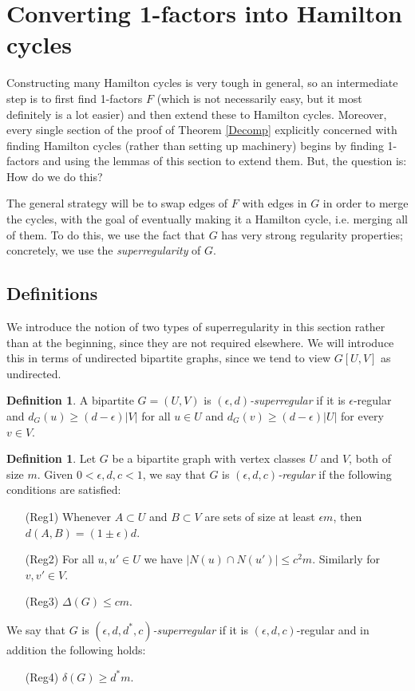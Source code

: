 \documentclass[10pt,letterpaper, reqno]{amsart}
\theoremstyle{definition}
\newtheorem{defn}[thm]{Definition}
\numberwithin{equation}{section}
\begin{document}
\section{Converting 1-factors into Hamilton cycles}\label{Factors}

\noindent  Constructing many Hamilton cycles is very tough in general, so an intermediate step is to first find 1-factors $F$ (which is not necessarily easy, but it most definitely is a lot easier) and then extend these to Hamilton cycles. Moreover, every single section of the proof of Theorem \ref{Decomp} explicitly concerned with finding Hamilton cycles (rather than setting up machinery) begins by finding 1-factors and using the lemmas of this section to extend them.  But, the question is: How do we do this? 

The general strategy will be to swap edges of $F$ with edges in $G$ in order to merge the cycles, with the goal of eventually making it a Hamilton cycle, i.e. merging all of them. To do this, we use the fact that $G$ has very strong regularity properties; concretely, we use the \textit{superregularity} of $G$.

\subsection{Definitions} We introduce the notion of two types of superregularity in this section rather than at the beginning, since they are not required elsewhere. We will introduce this in terms of undirected bipartite graphs, since we tend to view $G[U,V]$ as undirected.  

\begin{defn}
	A bipartite $G=(U,V)$ is \textit{$(\epsilon,d)$-superregular} if it is $\epsilon$-regular and $d_G(u) \geq (d-\epsilon)|V| $ for all $u \in U$ and $d_G(v) \geq (d-\epsilon)|U|$ for every $v \in V$. 
\end{defn}
 
\begin{defn}
	Let $G$ be a bipartite graph with vertex classes $U$ and $V$, both of size $m$. Given $0 < \epsilon, d, c <1$, we say that $G$ is \textit{$(\epsilon, d, c)$-regular} if the following conditions are satisfied:
	\begin{itemize}
		\item[(Reg1)] Whenever $A \subset U$ and $B\subset V$ are sets of size at least $\epsilon m$, then $d(A,B) = (1\pm\epsilon)d$.
		\item[(Reg2)] For all $u, u' \in U$ we have $|N(u) \cap N(u')| \leq c^2m$. Similarly for $v, v' \in V$. 
		\item[(Reg3)] $\Delta(G) \leq cm$. 
	\end{itemize}
	We say that $G$ is \textit{$(\epsilon, d, d^*, c)$-superregular} if it is $(\epsilon, d, c)$-regular and in addition the following holds:
	\begin{itemize}
		\item[(Reg4)] $\delta(G) \geq d^*m$.
	\end{itemize}
\end{defn}
\end{document}
